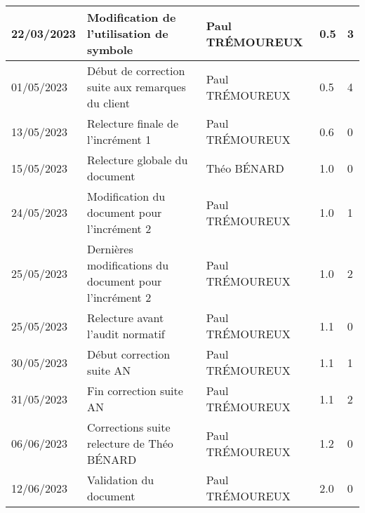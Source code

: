 \begin{longtable}[l]{|p{2cm}|p{5.6cm}|p{2.9cm}|p{1.5cm}|p{1.7cm}|}
    \hline
        22/03/2023 & Modification de l'utilisation de symbole & Paul \newline TRÉMOUREUX & 0.5 & 3\\
    \hline
        01/05/2023 & Début de correction suite aux remarques du client & Paul \newline TRÉMOUREUX & 0.5 & 4\\
    \hline
        13/05/2023 & Relecture finale de l'incrément 1 & Paul \newline TRÉMOUREUX & 0.6 & 0\\
    \hline
        15/05/2023 & Relecture globale du document & Théo \newline BÉNARD & 1.0 & 0\\
    \hline
        24/05/2023 & Modification du document pour l'incrément 2 & Paul \newline TRÉMOUREUX & 1.0 & 1\\
    \hline
        25/05/2023 & Dernières modifications du document pour l'incrément 2 & Paul \newline TRÉMOUREUX & 1.0 & 2\\
    \hline
        25/05/2023 & Relecture avant l'audit normatif & Paul \newline TRÉMOUREUX & 1.1 & 0\\
    \hline
        30/05/2023 & Début correction suite AN & Paul \newline TRÉMOUREUX & 1.1 & 1\\
    \hline
        31/05/2023 & Fin correction suite AN & Paul \newline TRÉMOUREUX & 1.1 & 2\\
    \hline
        06/06/2023 & Corrections suite relecture de Théo BÉNARD & Paul \newline TRÉMOUREUX & 1.2 & 0\\
    \hline
        12/06/2023 & Validation du document & Paul \newline TRÉMOUREUX & 2.0 & 0\\
    \hline
\end{longtable}

